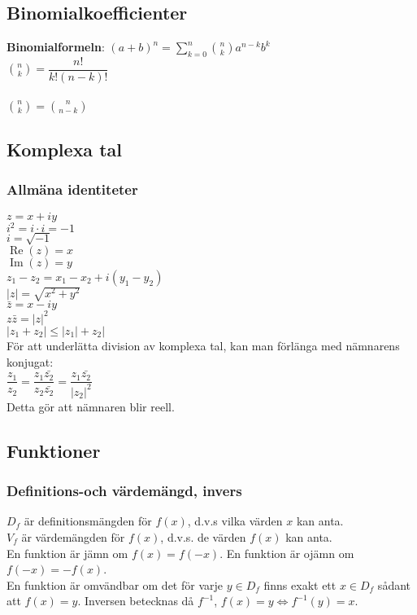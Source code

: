 \documentclass{article}
\DeclareMathOperator{\re}{Re}
\DeclareMathOperator{\im}{Im}
\begin{document}
\subsection{Binomialkoefficienter}
\textbf{Binomialformeln}: $(a + b)^n = \sum\limits_{k=0}^n \binom{n}{k}a^{n-k}b^k$\\
$\binom{n}{k} = \dfrac{n!}{k!(n-k)!}$\\
\\
$\binom{n}{k} = \binom{n}{n-k}$
\subsection{Komplexa tal}
\subsubsection{Allmäna identiteter}

\begin{doublespace}
$z = x + iy$ \\ $i^2 = i \cdot i = -1$ \\ $i = \sqrt{-1}$ \\ $\re(z) = x$ \\ $\im(z) = y$ \\
$z_1 - z_2 = x_1 - x_2 + i(y_1 - y_2)$ \\
$|z| = \sqrt{x^2 + y^2}$ \\
$\bar{z} = x - iy$ \\
$z\bar{z} = |z|^2$ \\
$|z_1 + z_2| \leq |z_1| + z_2|$ \\
För att underlätta division av komplexa tal, kan man förlänga med nämnarens konjugat:\\
$\dfrac{z_1}{z_2} = \dfrac{z_1\bar{z_2}}{z_2\bar{z_2}} = \dfrac{z_1\bar{z_2}}{|z_2|^2}$ \\
Detta gör att nämnaren blir reell.
\end{doublespace}
\subsection{Funktioner}
\subsubsection{Definitions-och värdemängd, invers}
$D_f$ är definitionsmängden för $f(x)$, d.v.s vilka värden $x$ kan anta.\\
$V_f$ är värdemängden för $f(x)$, d.v.s. de värden $f(x)$ kan anta. \\
En funktion är jämn om $f(x) = f(-x)$. En funktion är ojämn om $f(-x) = -f(x)$.
\\
En funktion är omvändbar om det för varje $y \in D_f$ finns exakt ett $x \in D_f$ sådant att $f(x) = y$. Inversen betecknas då $f^{-1}$, $f(x) = y \Leftrightarrow f^{-1}(y) = x$.
\end{document}
